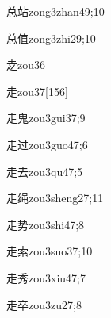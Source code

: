 \begin{verbete}{总站}{zong3zhan4}{9;10}
\end{verbete}

\begin{verbete}{总值}{zong3zhi2}{9;10}
\end{verbete}

\begin{verbete}{赱}{zou3}{6}
\end{verbete}

\begin{verbete}{走}{zou3}{7}[156]
\end{verbete}

\begin{verbete}{走鬼}{zou3gui3}{7;9}
\end{verbete}

\begin{verbete}{走过}{zou3guo4}{7;6}
\end{verbete}

\begin{verbete}{走去}{zou3qu4}{7;5}
\end{verbete}

\begin{verbete}{走绳}{zou3sheng2}{7;11}
\end{verbete}

\begin{verbete}{走势}{zou3shi4}{7;8}
\end{verbete}

\begin{verbete}{走索}{zou3suo3}{7;10}
\end{verbete}

\begin{verbete}{走秀}{zou3xiu4}{7;7}
\end{verbete}

\begin{verbete}{走卒}{zou3zu2}{7;8}
\end{verbete}

